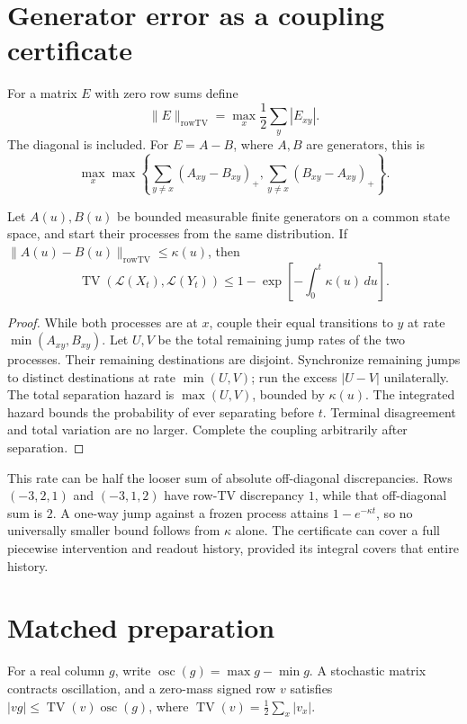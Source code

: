 \section{Generator error as a coupling certificate}

For a matrix $E$ with zero row sums define
\[
 \|E\|_{\mathrm{rowTV}}=\max_x\frac12\sum_y|E_{xy}|.
\]
The diagonal is included. For $E=A-B$, where $A,B$ are generators, this is
\[
 \max_x\max\left\{
  \sum_{y\ne x}(A_{xy}-B_{xy})_+,
  \sum_{y\ne x}(B_{xy}-A_{xy})_+\right\}.
\]

\begin{theorem}
\label{robustphysics:coupling}
Let $A(u),B(u)$ be bounded measurable finite generators on a common state
space, and start their processes from the same distribution. If
$\|A(u)-B(u)\|_{\mathrm{rowTV}}\le\kappa(u)$, then
\[
 \operatorname{TV}(\mathcal L(X_t),\mathcal L(Y_t))
 \le 1-\exp\left[-\int_0^t\kappa(u)\,du\right].
\]
\end{theorem}

\begin{proof}
While both processes are at $x$, couple their equal transitions to $y$ at
rate $\min(A_{xy},B_{xy})$. Let $U,V$ be the total remaining jump rates
of the two processes. Their remaining destinations are disjoint. Synchronize
remaining jumps to distinct destinations at rate $\min(U,V)$; run the excess
$|U-V|$ unilaterally. The total separation hazard is $\max(U,V)$, bounded
by $\kappa(u)$. The integrated hazard bounds the probability of ever separating
before $t$. Terminal disagreement and total variation are no larger. Complete
the coupling arbitrarily after separation.
\end{proof}

This rate can be half the looser sum of absolute off-diagonal discrepancies.
Rows $(-3,2,1)$ and $(-3,1,2)$ have row-TV discrepancy $1$, while that
off-diagonal sum is $2$. A one-way jump against a frozen process attains
$1-e^{-\kappa t}$, so no universally smaller bound follows from $\kappa$
alone. The certificate can cover a full piecewise intervention and readout
history, provided its integral covers that entire history.

\section{Matched preparation}

For a real column $g$, write
$\operatorname{osc}(g)=\max g-\min g$. A stochastic matrix contracts
oscillation, and a zero-mass signed row $v$ satisfies
$|vg|\le\operatorname{TV}(v)\operatorname{osc}(g)$, where
$\operatorname{TV}(v)=\tfrac12\sum_x|v_x|$.

